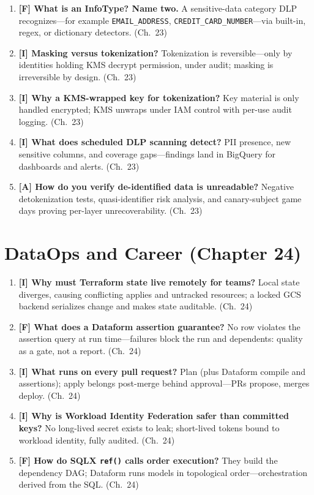 \begin{enumerate}
    \item \textbf{[F] What is an InfoType? Name two.} A sensitive-data category DLP
    recognizes---for example \texttt{EMAIL\_ADDRESS}, \texttt{CREDIT\_CARD\_NUMBER}---via built-in,
    regex, or dictionary detectors. (Ch.~23)
    \item \textbf{[I] Masking versus tokenization?} Tokenization is reversible---only by identities
    holding KMS decrypt permission, under audit; masking is irreversible by design. (Ch.~23)
    \item \textbf{[I] Why a KMS-wrapped key for tokenization?} Key material is only handled
    encrypted; KMS unwraps under IAM control with per-use audit logging. (Ch.~23)
    \item \textbf{[I] What does scheduled DLP scanning detect?} PII presence, new sensitive
    columns, and coverage gaps---findings land in BigQuery for dashboards and alerts. (Ch.~23)
    \item \textbf{[A] How do you verify de-identified data is unreadable?} Negative detokenization
    tests, quasi-identifier risk analysis, and canary-subject game days proving per-layer
    unrecoverability. (Ch.~23)
\end{enumerate}

\section{DataOps and Career (Chapter 24)}
\begin{enumerate}
    \item \textbf{[I] Why must Terraform state live remotely for teams?} Local state diverges,
    causing conflicting applies and untracked resources; a locked GCS backend serializes change and
    makes state auditable. (Ch.~24)
    \item \textbf{[F] What does a Dataform assertion guarantee?} No row violates the assertion
    query at run time---failures block the run and dependents: quality as a gate, not a report.
    (Ch.~24)
    \item \textbf{[I] What runs on every pull request?} Plan (plus Dataform compile and
    assertions); apply belongs post-merge behind approval---PRs propose, merges deploy. (Ch.~24)
    \item \textbf{[I] Why is Workload Identity Federation safer than committed keys?} No long-lived
    secret exists to leak; short-lived tokens bound to workload identity, fully audited. (Ch.~24)
    \item \textbf{[F] How do SQLX \texttt{ref()} calls order execution?} They build the dependency
    DAG; Dataform runs models in topological order---orchestration derived from the SQL. (Ch.~24)
\end{enumerate}

